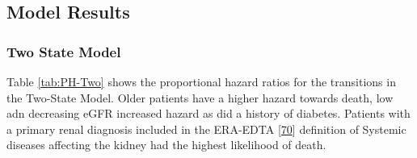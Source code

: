 \documentclass[
]{article}
\begin{document}
\hypertarget{model-results}{%
\subsection{Model Results}\label{model-results}}

\hypertarget{two-state-model}{%
\subsubsection{Two State Model}\label{two-state-model}}

Table \ref{tab:PH-Two} shows the proportional hazard ratios for the transitions in the Two-State Model. Older patients have a higher hazard towards death, low adn decreasing eGFR increased hazard as did a history of diabetes. Patients with a primary renal diagnosis included in the ERA-EDTA {[}\protect\hyperlink{ref-venkat-raman_new_2012}{70}{]} definition of Systemic diseases affecting the kidney had the highest likelihood of death.
\end{document}
